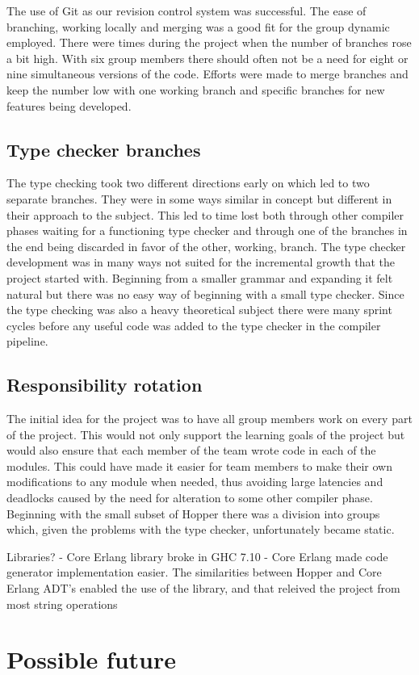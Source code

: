 The use of Git as our revision control system was successful. The ease of branching, working locally and merging was a good fit for the group dynamic employed. 
There were times during the project when the number of branches rose a bit high. With six group members there should often not be a need for eight or nine simultaneous versions of the code. Efforts were made to merge branches and keep the number low with one working branch and specific branches for new features being developed.

\subsection{Type checker branches}

The type checking took two different directions early on which led to two separate branches. They were in some ways similar in concept but different in their approach to the subject. This led to time lost both through other compiler phases waiting for a functioning type checker and through one of the branches in the end being discarded in favor of the other, working, branch. The type checker development was in many ways not suited for the incremental growth that the project started with. Beginning from a smaller grammar and expanding it felt natural but there was no easy way of beginning with a small type checker. Since the type checking was also a heavy theoretical subject there were many sprint cycles before any useful code was added to the type checker in the compiler pipeline. 

\subsection{Responsibility rotation}

The initial idea for the project was to have all group members work on every part of the project. This would not only support the learning goals of the project but would also ensure that each member of the team wrote code in each of the modules. This could have made it easier for team members to make their own modifications to any module when needed, thus avoiding large latencies and deadlocks caused by the need for alteration to some other compiler phase. 
Beginning with the small subset of Hopper there was a division into groups which, given the problems with the type checker, unfortunately became static.




Libraries?
- Core Erlang library broke in GHC 7.10
- Core Erlang made code generator implementation easier. The similarities between Hopper and Core Erlang ADT's enabled the use of the library, and that releived the project from most string operations


\section{Possible future}

